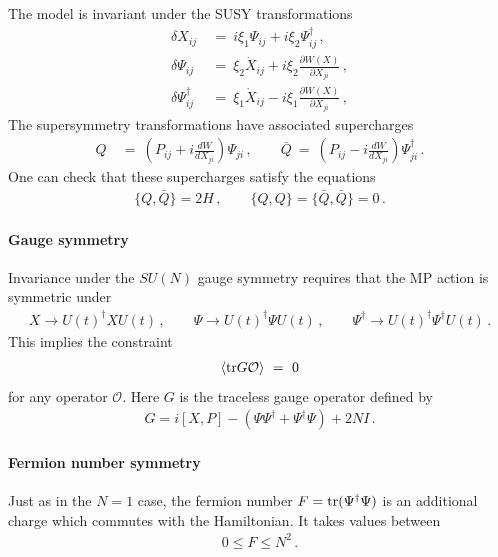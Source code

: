 \documentclass[a4paper,11pt]{article}
\newcommand{\tr}{{\rm {tr}}}
\numberwithin{equation}{section}
\begin{document}
The model is invariant under the SUSY transformations  
%
\begin{align}
    \delta X_{ij} \ &= \ i \xi_1 \Psi_{ij} +  i \xi_2 \Psi_{ij}^\dagger \, ,\\
    \delta \Psi_{ij} \ &= \ \xi_2 \dot X_{ij} + i \xi_2 \frac{\partial W(X)}{\partial X_{ji}} \, , \\
    \delta \Psi_{ij}^\dagger  \ &= \ \xi_1 \dot X_{ij} - i \xi_1 \frac{\partial W(X)}{\partial X_{ji}} \, ,
\end{align}
%
The supersymmetry transformations have associated supercharges
\begin{align}
    \label{eq:superchargesaa}
    Q \ &= \  \left( P_{ij} + i \frac{d W}{d X_{ji}} \right) \Psi_{ji} \, , \qquad 
    \bar Q \ = \ \left( P_{ij} - i \frac{d W}{d X_{ji}} \right) \Psi_{ji}^\dagger \, .
\end{align}
%
One can check that these supercharges satisfy the equations
%
\begin{align}
    \{ Q, \bar Q \} = 2H \, , \qquad \{ Q, Q \} = \{ \bar Q, \bar Q \} = 0 \,.
\end{align}


\paragraph{Gauge symmetry} Invariance under the $SU(N)$ gauge symmetry requires that the MP action is symmetric under
%
\begin{align}
    X \to U(t)^\dagger X U(t)  \, , \qquad \Psi \to U(t)^\dagger \Psi  U(t) \, , \qquad \Psi^\dagger \to U(t)^\dagger \Psi^\dagger U(t) \, .
\end{align}
%
This implies the constraint 
%
\begin{align}
    \left< \tr G \mathcal O \right> \ = \ 0  
\end{align}
%
for any operator $\mathcal O$. Here $G$ is the traceless gauge operator defined by
%
\begin{align}
    \label{eq:gauge}
    G = i [X, P] - (\Psi \Psi^\dagger + \Psi^\dagger \Psi ) + 2  N I \, .
\end{align}
%

\paragraph{Fermion number symmetry} Just as in the $N = 1$ case, the fermion number $F
= \tr ( \Psi^\dagger \Psi) $ is an additional charge which commutes with the Hamiltonian. It takes values between
%
\begin{align}
    0 \leq F \leq N^2 \, .
\end{align}
\end{document}
